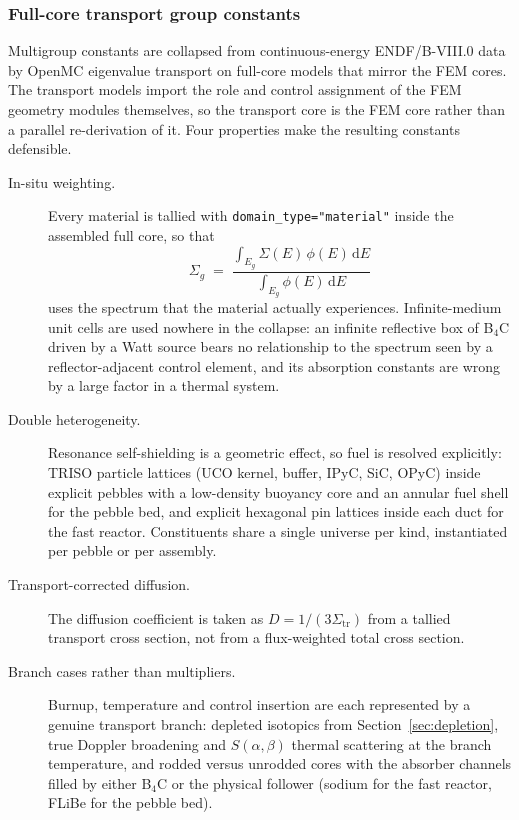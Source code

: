 \documentclass[preprint,12pt]{elsarticle}
\newcommand{\Sig}[1]{\Sigma_{\mathrm{#1}}}
\begin{document}
\subsubsection{Full-core transport group constants}
\label{sec:groupconstants}

Multigroup constants are collapsed from continuous-energy ENDF/B-VIII.0 data
\citep{brown2018} by OpenMC \citep{romano2013} eigenvalue transport on
full-core models that mirror the FEM cores. The
transport models import the role and control assignment of the FEM geometry
modules themselves, so the transport core is the FEM core rather than a
parallel re-derivation of it. Four properties make the resulting constants
defensible.

\begin{description}
\item[In-situ weighting.] Every material is tallied with
\texttt{domain\_type="material"} inside the assembled full core, so that
\begin{equation}
\Sigma_g \;=\; \frac{\displaystyle\int_{E_g} \Sigma(E)\,\phi(E)\,\mathrm{d}E}
                    {\displaystyle\int_{E_g} \phi(E)\,\mathrm{d}E}
\label{eq:collapse}
\end{equation}
uses the spectrum that the material actually experiences. Infinite-medium unit
cells are used nowhere in the collapse: an infinite reflective box of B$_4$C
driven by a Watt source bears no relationship to the spectrum seen by a
reflector-adjacent control element, and its absorption constants are wrong by a
large factor in a thermal system.

\item[Double heterogeneity.] Resonance self-shielding is a geometric effect, so
fuel is resolved explicitly: TRISO particle lattices (UCO kernel, buffer, IPyC,
SiC, OPyC) inside explicit pebbles with a low-density buoyancy core and an
annular fuel shell for the pebble bed, and explicit hexagonal pin lattices
inside each duct for the fast reactor. Constituents share a single universe per
kind, instantiated per pebble or per assembly.

\item[Transport-corrected diffusion.] The diffusion coefficient is taken as
$D = 1/(3\Sig{tr})$ \citep{duderstadt1976} from a tallied transport cross
section, not from a
flux-weighted total cross section.

\item[Branch cases rather than multipliers.] Burnup, temperature and control
insertion are each represented by a genuine transport branch: depleted
isotopics from Section~\ref{sec:depletion}, true Doppler broadening and
$S(\alpha,\beta)$ thermal scattering at the branch temperature, and rodded
versus unrodded cores with the absorber channels filled by either B$_4$C or the
physical follower (sodium for the fast reactor, FLiBe for the pebble bed).
\end{description}
\end{document}
